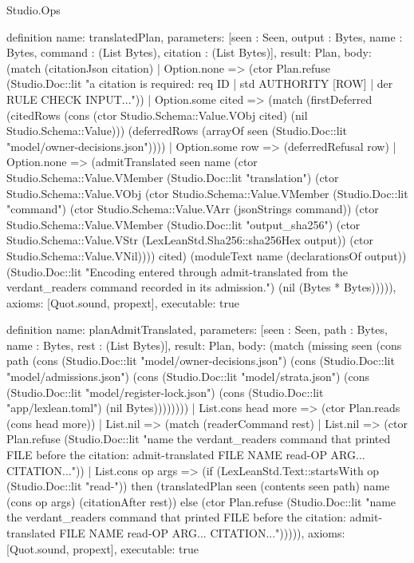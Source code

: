 \begin{lexlean}{Studio.Ops}
\begin{semanticmodule}
definition{
  name: translatedPlan,
  parameters: [seen : Seen, output : Bytes, name : Bytes, command : (List Bytes), citation : (List Bytes)],
  result: Plan,
  body: (match (citationJson citation)
    | Option.none => (ctor Plan.refuse (Studio.Doc::lit "a citation is required: req ID | std AUTHORITY [ROW] | der RULE CHECK INPUT...\n"))
    | Option.some cited => (match (firstDeferred (citedRows (cons (ctor Studio.Schema::Value.VObj cited) (nil Studio.Schema::Value))) (deferredRows (arrayOf seen (Studio.Doc::lit "model/owner-decisions.json"))))
      | Option.some row => (deferredRefusal row)
      | Option.none => (admitTranslated seen name (ctor Studio.Schema::Value.VMember (Studio.Doc::lit "translation") (ctor Studio.Schema::Value.VObj (ctor Studio.Schema::Value.VMember (Studio.Doc::lit "command") (ctor Studio.Schema::Value.VArr (jsonStrings command)) (ctor Studio.Schema::Value.VMember (Studio.Doc::lit "output_sha256") (ctor Studio.Schema::Value.VStr (LexLeanStd.Sha256::sha256Hex output)) (ctor Studio.Schema::Value.VNil)))) cited) (moduleText name (declarationsOf output)) (Studio.Doc::lit "Encoding entered through admit-translated from the verdant_readers command recorded in its admission.") (nil (Bytes * Bytes))))),
  axioms: [Quot.sound, propext],
  executable: true
}

definition{
  name: planAdmitTranslated,
  parameters: [seen : Seen, path : Bytes, name : Bytes, rest : (List Bytes)],
  result: Plan,
  body: (match (missing seen (cons path (cons (Studio.Doc::lit "model/owner-decisions.json") (cons (Studio.Doc::lit "model/admissions.json") (cons (Studio.Doc::lit "model/strata.json") (cons (Studio.Doc::lit "model/register-lock.json") (cons (Studio.Doc::lit "app/lexlean.toml") (nil Bytes))))))))
    | List.cons head more => (ctor Plan.reads (cons head more))
    | List.nil => (match (readerCommand rest)
      | List.nil => (ctor Plan.refuse (Studio.Doc::lit "name the verdant_readers command that printed FILE before the citation: admit-translated FILE NAME read-OP ARG... CITATION...\n"))
      | List.cons op args => (if (LexLeanStd.Text::startsWith op (Studio.Doc::lit "read-")) then (translatedPlan seen (contents seen path) name (cons op args) (citationAfter rest)) else (ctor Plan.refuse (Studio.Doc::lit "name the verdant_readers command that printed FILE before the citation: admit-translated FILE NAME read-OP ARG... CITATION...\n"))))),
  axioms: [Quot.sound, propext],
  executable: true
}





\end{semanticmodule}
\end{lexlean}
